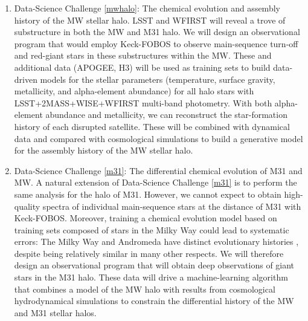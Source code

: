 \documentclass[oneside,11pt]{amsart}
\newcounter{chalno}
\newcommand{\chal}[1]{\refstepcounter{chalno}\label{#1}}
\begin{document}
\begin{enumerate}[rightmargin=0.2cm,leftmargin=0.2cm]

\chal{mwhalo} 
%
\item[] {\textsf {\large  Data-Science Challenge \ref{mwhalo}: The
chemical evolution and assembly history of the MW stellar halo.}} LSST
and WFIRST will reveal a trove of substructure in both the MW and M31
halo.  We will design an observational program that would employ
Keck-FOBOS to observe main-sequence turn-off and red-giant stars in
these substructures within the MW.  These and additional data (APOGEE,
H3) will be used as training sets to build data-driven models for the
stellar parameters (temperature, surface gravity, metallicity, and
alpha-element abundance) for all halo stars with LSST+2MASS+WISE+WFIRST
multi-band photometry.  With both alpha-element abundance and
metallicity, we can reconstruct the star-formation history of each
disrupted satellite. These will be combined with dynamical data and
compared with cosmological simulations to build a generative model for
the assembly history of the MW stellar halo.

\medskip

\chal{m31} 
%
\item[] {\textsf {\large Data-Science Challenge \ref{m31}: The
differential chemical evolution of M31 and MW.}}  A natural extension of
Data-Science Challenge \ref{m31} is to perform the same analysis for the
halo of M31.  However, we cannot expect to obtain high-quality spectra
of individual main-sequence stars at the distance of M31 with
Keck-FOBOS.  Moreover, training a chemical evolution model based on
training sets composed of stars in the Milky Way could lead to
systematic errors:  The Milky Way and Andromeda have distinct 
evolutionary histories \citep[e.g.][]{2005MNRAS.356.1071R}, despite being
relatively similar in many other respects.  We will therefore design an
observational program that will obtain deep observations of giant stars
in the M31 halo.  These data will drive a machine-learning algorithm
that combines a model of the MW halo with results from cosmological
hydrodynamical simulations to constrain the differential history of the
MW and M31 stellar halos.

\medskip


\end{enumerate}
\end{document}
